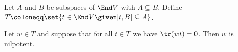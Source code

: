 Let $A$ and $B$ be subspaces of $\End V$ with $A \subseteq B$.
Define $T\coloneqq \set{t \in \End V\given [t, B] \subseteq A}$.

Let $w \in T$ and suppose that for all $t \in T$ we have $\tr(wt) = 0$.
Then $w$ is nilpotent.
